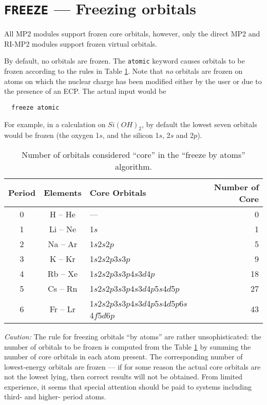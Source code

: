 \section{{\tt FREEZE} --- Freezing orbitals}
\label{mp2:core}

All MP2 modules support frozen core orbitals, however, only the direct
MP2 and RI-MP2 modules support frozen virtual orbitals. 

By default, no orbitals are frozen.  The \verb+atomic+ keyword causes
orbitals to be frozen according to the rules in Table
\ref{tbl:freeze-by-atoms}.  Note that {\em no} orbitals are frozen on
atoms on which the nuclear charge has been modified either by the user
or due to the presence of an ECP.  The actual input would be
\begin{verbatim}
  freeze atomic
\end{verbatim}
For example, in a calculation on $Si(OH)_2$, by default the lowest
seven orbitals would be frozen (the oxygen 1$s$, and the silicon 1$s$,
2$s$ and 2$p$).

\begin{table}[htbp]
\label{tbl:freeze-by-atoms}

\center

\begin{tabular}{cclr}
\hline\hline
Period & Elements & Core Orbitals & Number of Core \\
\hline
0 & H -- He  & ---                                          &  0 \\
1 & Li -- Ne & 1$s$                                         &  1 \\
2 & Na -- Ar & 1$s$2$s$2$p$                                 &  5 \\
3 & K -- Kr  & 1$s$2$s$2$p$3$s$3$p$                         &  9 \\
4 & Rb -- Xe & 1$s$2$s$2$p$3$s$3$p$4$s$3$d$4$p$             & 18 \\
5 & Cs -- Rn & 1$s$2$s$2$p$3$s$3$p$4$s$3$d$4$p$5$s$4$d$5$p$ & 27 \\
6 & Fr -- Lr & 1$s$2$s$2$p$3$s$3$p$4$s$3$d$4$p$5$s$4$d$5$p$6$s$4$f$5$d$6$p$
     & 43 \\
\hline\hline
\end{tabular}

\caption{Number of orbitals considered ``core'' in the ``freeze by
atoms'' algorithm.}

\end{table}

{\em Caution:\/} The rule for freezing orbitals ``by atoms'' are
rather unsophisticated: the number of orbitals to be frozen is
computed from the Table \ref{tbl:freeze-by-atoms} by summing the number
of core orbitals in each atom present.  The corresponding number of
lowest-energy orbitals are frozen --- if for some reason the actual
core orbitals are not the lowest lying, then correct results will not
be obtained.  From limited experience, it seems that special attention
should be paid to systems including third- and higher- period atoms.

